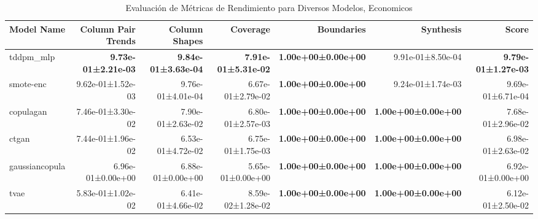 \begin{table}[H]
\centering
\fontsize{7}{14}\selectfont
\caption{Evaluaci\'on de M\'etricas de Rendimiento para Diversos Modelos, Economicos}
\label{table-score-economicos-a}
\begin{tabular}{|l|r|r|r|r|r|r|}
\hline
\rowcolor[gray]{0.8}
Model Name & Column Pair Trends & Column Shapes & Coverage & Boundaries & Synthesis & \textbf{Score} \\
\hline tddpm\_mlp & \bfseries 9.73e-01±2.21e-03 & \bfseries 9.84e-01±3.63e-04 & \bfseries 7.91e-01±5.31e-02 & \bfseries 1.00e+00±0.00e+00 & 9.91e-01±8.50e-04 & \bfseries 9.79e-01±1.27e-03 \\
\hline smote-enc & 9.62e-01±1.52e-03 & 9.76e-01±4.01e-04 & 6.67e-01±2.79e-02 & \bfseries 1.00e+00±0.00e+00 & 9.24e-01±1.74e-03 & 9.69e-01±6.71e-04 \\
\hline copulagan & 7.46e-01±3.30e-02 & 7.90e-01±2.63e-02 & 6.80e-01±2.57e-03 & \bfseries 1.00e+00±0.00e+00 & \bfseries 1.00e+00±0.00e+00 & 7.68e-01±2.96e-02 \\
\hline ctgan & 7.44e-01±1.96e-02 & 6.53e-01±4.72e-02 & 6.75e-01±1.75e-03 & \bfseries 1.00e+00±0.00e+00 & \bfseries 1.00e+00±0.00e+00 & 6.98e-01±2.63e-02 \\
\hline gaussiancopula & 6.96e-01±0.00e+00 & 6.88e-01±0.00e+00 & 5.65e-01±0.00e+00 & \bfseries 1.00e+00±0.00e+00 & \bfseries 1.00e+00±0.00e+00 & 6.92e-01±0.00e+00 \\
\hline tvae & 5.83e-01±1.02e-02 & 6.41e-01±4.66e-02 & 8.59e-02±1.28e-02 & \bfseries 1.00e+00±0.00e+00 & \bfseries 1.00e+00±0.00e+00 & 6.12e-01±2.50e-02 \\
\hline
\end{tabular}
\end{table}
